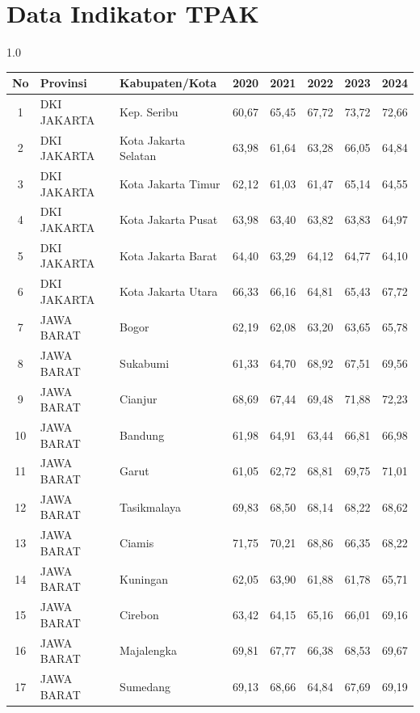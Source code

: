 \section*{Data Indikator TPAK}
\begin{spacing}{1.0}
\scriptsize
\setlength{\tabcolsep}{2pt}
\begin{longtable}{|c|p{2.2cm}|p{2.8cm}|c|c|c|c|c|}
\hline
\textbf{No} & \textbf{Provinsi} & \textbf{Kabupaten/Kota} & \textbf{2020} & \textbf{2021} & \textbf{2022} & \textbf{2023} & \textbf{2024} \\ \hline
\endhead
1 & DKI JAKARTA & Kep. Seribu & 60,67 & 65,45 & 67,72 & 73,72 & 72,66 \\ \hline
2 & DKI JAKARTA & Kota Jakarta Selatan & 63,98 & 61,64 & 63,28 & 66,05 & 64,84 \\ \hline
3 & DKI JAKARTA & Kota Jakarta Timur & 62,12 & 61,03 & 61,47 & 65,14 & 64,55 \\ \hline
4 & DKI JAKARTA & Kota Jakarta Pusat & 63,98 & 63,40 & 63,82 & 63,83 & 64,97 \\ \hline
5 & DKI JAKARTA & Kota Jakarta Barat & 64,40 & 63,29 & 64,12 & 64,77 & 64,10 \\ \hline
6 & DKI JAKARTA & Kota Jakarta Utara & 66,33 & 66,16 & 64,81 & 65,43 & 67,72 \\ \hline
7 & JAWA BARAT & Bogor & 62,19 & 62,08 & 63,20 & 63,65 & 65,78 \\ \hline
8 & JAWA BARAT & Sukabumi & 61,33 & 64,70 & 68,92 & 67,51 & 69,56 \\ \hline
9 & JAWA BARAT & Cianjur & 68,69 & 67,44 & 69,48 & 71,88 & 72,23 \\ \hline
10 & JAWA BARAT & Bandung & 61,98 & 64,91 & 63,44 & 66,81 & 66,98 \\ \hline
11 & JAWA BARAT & Garut & 61,05 & 62,72 & 68,81 & 69,75 & 71,01 \\ \hline
12 & JAWA BARAT & Tasikmalaya & 69,83 & 68,50 & 68,14 & 68,22 & 68,62 \\ \hline
13 & JAWA BARAT & Ciamis & 71,75 & 70,21 & 68,86 & 66,35 & 68,22 \\ \hline
14 & JAWA BARAT & Kuningan & 62,05 & 63,90 & 61,88 & 61,78 & 65,71 \\ \hline
15 & JAWA BARAT & Cirebon & 63,42 & 64,15 & 65,16 & 66,01 & 69,16 \\ \hline
16 & JAWA BARAT & Majalengka & 69,81 & 67,77 & 66,38 & 68,53 & 69,67 \\ \hline
17 & JAWA BARAT & Sumedang & 69,13 & 68,66 & 64,84 & 67,69 & 69,19 \\ \hline

\end{longtable}
\end{spacing}
